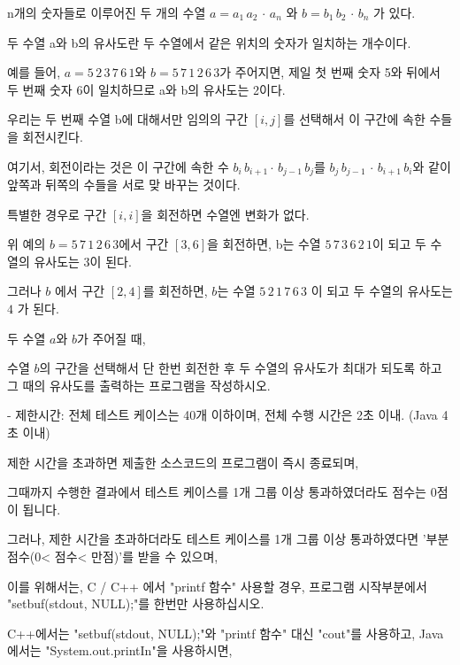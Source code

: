 \documentclass [12pt] {oblivoir}
\begin{document}
n개의 숫자들로 이루어진 두 개의 수열 $a = a_{1}\,a_{2}\,\cdot\,a_{n}$ 와 $b = b_{1}\,b_{2}\,\cdot\,b_{n}$ 가 있다.

두 수열 a와 b의 유사도란 두 수열에서 같은 위치의 숫자가 일치하는 개수이다.

예를 들어, $a = 5\,2\,3\,7\,6\,1$와 $b = 5\,7\,1\,2\,6\,3$가 주어지면, 제일 첫 번째 숫자 5와 뒤에서 두 번째 숫자 6이 일치하므로 a와 b의 유사도는 2이다.

\vspace{3mm}

우리는 두 번째 수열 b에 대해서만 임의의 구간 $[i,j]$를 선택해서 이 구간에 속한 수들을 회전시킨다.

여기서, 회전이라는 것은 이 구간에 속한 수 $b_{i}\,b_{i+1}\cdot\, b_{j−1}\,b_{j}$를 $b_{j}\,b_{j−1}\,\cdot\,b_{i+1}\,b_{i}$와 같이 앞쪽과 뒤쪽의 수들을 서로 맞 바꾸는 것이다.

특별한 경우로 구간 $[i,i]$을 회전하면 수열엔 변화가 없다.

\vspace{3mm}

위 예의 $b = 5\,7\,1\,2\,6\,3$에서 구간 $[3,6]$을 회전하면, b는 수열 $5\,7\,3\,6\,2\,1$이 되고 두 수열의 유사도는 3이 된다.

그러나 $b$ 에서 구간 $[2,4]$를 회전하면, $b$는 수열 $5\,2\,1\,7\,6\,3$ 이 되고 두 수열의 유사도는 $4$ 가 된다.

\vspace{3mm}

두 수열 $a$와 $b$가 주어질 때,

수열 $b$의 구간을 선택해서 단 한번 회전한 후 두 수열의 유사도가 최대가 되도록 하고 그 때의 유사도를 출력하는 프로그램을 작성하시오.

\vspace{3mm}

- 제한시간: 전체 테스트 케이스는 40개 이하이며, 전체 수행 시간은 2초 이내. (Java 4초 이내)

    제한 시간을 초과하면 제출한 소스코드의 프로그램이 즉시 종료되며,

    그때까지 수행한 결과에서 테스트 케이스를 1개 그룹 이상 통과하였더라도 점수는 0점이 됩니다.

    그러나, 제한 시간을 초과하더라도 테스트 케이스를 1개 그룹 이상 통과하였다면 '부분 점수(0< 점수< 만점)'를 받을 수 있으며,

    이를 위해서는, C / C++ 에서 "printf 함수" 사용할 경우, 프로그램 시작부분에서 "setbuf(stdout, NULL);"를 한번만 사용하십시오.

    C++에서는 "setbuf(stdout, NULL);"와 "printf 함수" 대신 "cout"를 사용하고, Java에서는 "System.out.printIn"을 사용하시면,
\end{document}
